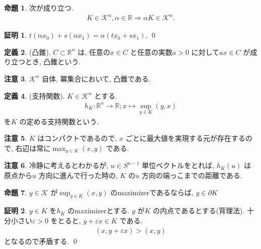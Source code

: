 \documentclass[10pt, fleqn, label-section=none]{bxjsarticle}
\theoremstyle{definition}
\newtheorem{dfn}{定義}[section]
\newtheorem{prop}[dfn]{命題}
\newtheorem*{pf*}{証明}
\newtheorem{remark}[dfn]{注意}
\newcommand{\veps}{\varepsilon}
\newcommand{\naraba}{\Rightarrow}
\renewcommand{\;}{\, ; \,}
\begin{document}
\begin{prop}次が成り立つ.
\begin{align*} K \in \mathcal K ^n, \alpha \in \mathbb R \naraba \alpha K \in \mathcal K ^n. \end{align*}
\end{prop}
\begin{pf*}
$t(\alpha x_0) + s(\alpha x_1) = \alpha (t x_0 + s x_1).$
\qed
\end{pf*}

\begin{dfn}(凸錐). $C \subset \mathbb R^n$ は, 任意の$x \in C$ と任意の実数$a > 0$ に対して$ax \in C$ が成り立つとき, 凸錐という. 

\end{dfn}

\begin{remark}$\mathcal K ^n$ 自体, 冪集合において, 凸錐である. 

\end{remark}


\begin{dfn}(支持関数). $K \in \mathcal K^n$ とする. 
\begin{align*} h_K: \mathbb R^n \rightarrow \mathbb R; x \mapsto \sup_{y \in K} (y, x)\end{align*}
を$K$ の定める支持関数という. 
\end{dfn}

\begin{remark}
$K$ はコンパクトであるので, $x$ ごとに最大値を実現する元が存在するので, 右辺は常に$\max_{y \in K}(x, y)$ である. 
\end{remark}

\begin{remark}冷静に考えるとわかるが, $u \in S^{n-1}$ 単位ベクトルをとれば, $h_K(u)$ は原点から$u$ 方向に進んで行った時の, $K$ の$u$ 方向の端っこまでの距離である. 


\end{remark}


\begin{prop}$y \in \mathcal K$ が$\sup_{y \in K}(x, y)$ のmaximizerであるならば, $y \in \partial K$
\end{prop}
\begin{pf*}
$y \in K$ を$h_K$ のmaximizerとする. $y$ が$K$ の内点であるとする(背理法). 十分小さい$\veps > 0$ をとると, $y + \veps x \in K$ である. 
\begin{align*} (x, y + \veps x) > (x, y)  \end{align*}
となるので矛盾する. 
\qed
\end{pf*}
\end{document}
